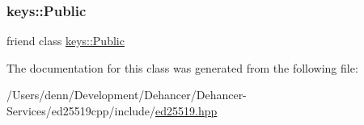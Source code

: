 \subsubsection{\texorpdfstring{keys\+::\+Public}{keys::Public}}
{\footnotesize\ttfamily friend class \mbox{\hyperlink{classed25519_1_1keys_1_1_public}{keys\+::\+Public}}\hspace{0.3cm}{\ttfamily [friend]}}



The documentation for this class was generated from the following file\+:\begin{DoxyCompactItemize}
\item 
/\+Users/denn/\+Development/\+Dehancer/\+Dehancer-\/\+Services/ed25519cpp/include/\mbox{\hyperlink{ed25519_8hpp}{ed25519.\+hpp}}\end{DoxyCompactItemize}
